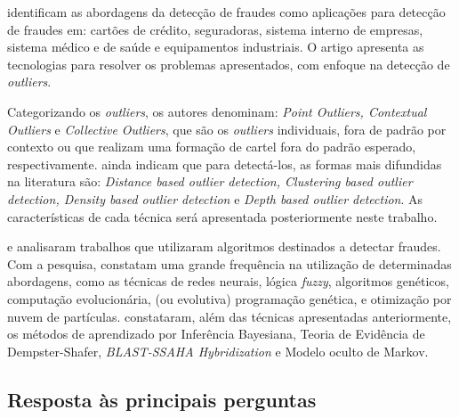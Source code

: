 \documentclass[smallextended]{svjour3}
\begin{document}
\cite{Bansal2016} identificam as abordagens da detecção de fraudes como aplicações para detecção de fraudes em: cartões de crédito, seguradoras, sistema interno de empresas, sistema médico e de saúde e equipamentos industriais. O artigo apresenta as tecnologias para resolver os problemas apresentados, com enfoque na detecção de \emph{outliers}. 

Categorizando os \emph{outliers}, os autores denominam: \emph{Point Outliers, Contextual Outliers} e \emph{Collective Outliers}, que são os \emph{outliers} individuais, fora de padrão por contexto ou que realizam uma formação de cartel fora do padrão esperado, respectivamente. \cite{Bansal2016} ainda indicam que para detectá-los, as formas mais difundidas na literatura são: \emph{Distance based outlier detection, Clustering based outlier detection, Density based outlier detection} e \emph{Depth based outlier detection}. As características de cada técnica será apresentada posteriormente neste trabalho.

\cite{Pejic-Bach2010} e \cite{Raj2011} analisaram trabalhos que utilizaram algoritmos destinados a detectar fraudes. Com a pesquisa, constatam uma grande frequência na utilização de determinadas abordagens, como as técnicas de redes neurais, lógica \emph{fuzzy}, algoritmos genéticos, computação evolucionária, (ou evolutiva) programação genética, e otimização por nuvem de partículas. \cite{Raj2011} constataram, além das técnicas apresentadas anteriormente, os métodos de aprendizado por Inferência Bayesiana, Teoria de Evidência de Dempster-Shafer, \emph{BLAST-SSAHA Hybridization} e Modelo oculto de Markov.

\subsection{Resposta às principais perguntas}
\end{document}
